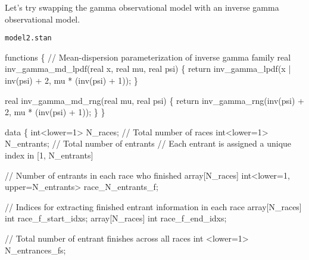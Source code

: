 \documentclass[
  letterpaper,
  DIV=11,
  numbers=noendperiod]{scrartcl}
\newenvironment{Shaded}{\begin{snugshade}}{\end{snugshade}}
\newcommand{\CommentTok}[1]{\textcolor[rgb]{0.37,0.37,0.37}{#1}}
\newcommand{\ControlFlowTok}[1]{\textcolor[rgb]{0.00,0.23,0.31}{#1}}
\newcommand{\DataTypeTok}[1]{\textcolor[rgb]{0.68,0.00,0.00}{#1}}
\newcommand{\DecValTok}[1]{\textcolor[rgb]{0.68,0.00,0.00}{#1}}
\newcommand{\KeywordTok}[1]{\textcolor[rgb]{0.00,0.23,0.31}{#1}}
\newcommand{\NormalTok}[1]{\textcolor[rgb]{0.00,0.23,0.31}{#1}}
\begin{document}
Let's try swapping the gamma observational model with an inverse gamma
observational model.

\begin{codelisting}

\caption{\texttt{model2.stan}}

\begin{Shaded}
\begin{Highlighting}[]
\KeywordTok{functions}\NormalTok{ \{}
  \CommentTok{// Mean{-}dispersion parameterization of inverse gamma family}
  \DataTypeTok{real}\NormalTok{ inv\_gamma\_md\_lpdf(}\DataTypeTok{real}\NormalTok{ x, }\DataTypeTok{real}\NormalTok{ mu, }\DataTypeTok{real}\NormalTok{ psi) \{}
    \ControlFlowTok{return}\NormalTok{ inv\_gamma\_lpdf(x | inv(psi) + }\DecValTok{2}\NormalTok{, mu * (inv(psi) + }\DecValTok{1}\NormalTok{));}
\NormalTok{  \}}

  \DataTypeTok{real}\NormalTok{ inv\_gamma\_md\_rng(}\DataTypeTok{real}\NormalTok{ mu, }\DataTypeTok{real}\NormalTok{ psi) \{}
    \ControlFlowTok{return}\NormalTok{ inv\_gamma\_rng(inv(psi) + }\DecValTok{2}\NormalTok{, mu * (inv(psi) + }\DecValTok{1}\NormalTok{));}
\NormalTok{  \}}
\NormalTok{\}}

\KeywordTok{data}\NormalTok{ \{}
  \DataTypeTok{int}\NormalTok{\textless{}}\KeywordTok{lower}\NormalTok{=}\DecValTok{1}\NormalTok{\textgreater{} N\_races;    }\CommentTok{// Total number of races}
  \DataTypeTok{int}\NormalTok{\textless{}}\KeywordTok{lower}\NormalTok{=}\DecValTok{1}\NormalTok{\textgreater{} N\_entrants; }\CommentTok{// Total number of entrants}
  \CommentTok{// Each entrant is assigned a unique index in [1, N\_entrants]}

  \CommentTok{// Number of entrants in each race who finished}
  \DataTypeTok{array}\NormalTok{[N\_races] }\DataTypeTok{int}\NormalTok{\textless{}}\KeywordTok{lower}\NormalTok{=}\DecValTok{1}\NormalTok{, }\KeywordTok{upper}\NormalTok{=N\_entrants\textgreater{} race\_N\_entrants\_f;}

  \CommentTok{// Indices for extracting finished entrant information in each race}
  \DataTypeTok{array}\NormalTok{[N\_races] }\DataTypeTok{int}\NormalTok{ race\_f\_start\_idxs;}
  \DataTypeTok{array}\NormalTok{[N\_races] }\DataTypeTok{int}\NormalTok{ race\_f\_end\_idxs;}

  \CommentTok{// Total number of entrant finishes across all races}
  \DataTypeTok{int}\NormalTok{ \textless{}}\KeywordTok{lower}\NormalTok{=}\DecValTok{1}\NormalTok{\textgreater{} N\_entrances\_fs;}


\end{Highlighting}
\end{Shaded}
\end{codelisting}
\end{document}
